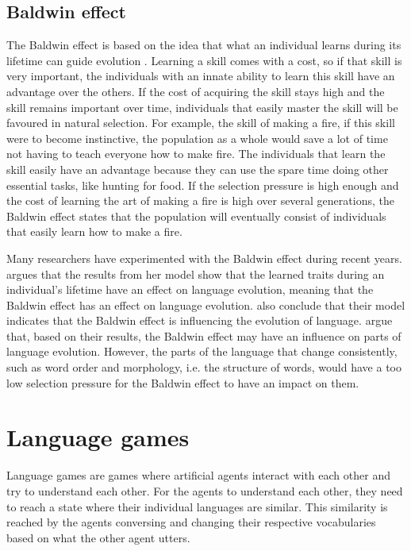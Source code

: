 \subsection{Baldwin effect}
The Baldwin effect is based on the idea that what an individual learns during its lifetime can guide evolution \citep{baldwin1896new}. Learning a skill comes with a cost, so if that skill is very important, the individuals with an innate ability to learn this skill have an advantage over the others. If the cost of acquiring the skill stays high and the skill remains important over time, individuals that easily master the skill will be favoured in natural selection. For example, the skill of making a fire, if this skill were to become instinctive, the population as a whole would save a lot of time not having to teach everyone how to make fire. The individuals that learn the skill easily have an advantage because they can use the spare time doing other essential tasks, like hunting for food. If the selection pressure is high enough and the cost of learning the art of making a fire is high over several generations, the Baldwin effect states that the population will eventually consist of individuals that easily learn how to make a fire.

Many researchers have experimented with the Baldwin effect during recent years. \citet{lipowska2011naming} argues that the results from her model show that the learned traits during an individual's lifetime have an effect on language evolution, meaning that the Baldwin effect has an effect on language evolution. \citet{zollman2010plasticity} also conclude that their model indicates that the Baldwin effect is influencing the evolution of language. \citet{chater2010language} argue that, based on their results, the Baldwin effect may have an influence on parts of language evolution. However, the parts of the language that change consistently, such as word order and morphology, i.e. the structure of words, would have a too low selection pressure for the Baldwin effect to have an impact on them.


\section{Language games}
Language games are games where artificial agents interact with each other and try to understand each other. For the agents to understand each other, they need to reach a state where their individual languages are similar. This similarity is reached by the agents conversing and changing their respective vocabularies based on what the other agent utters.

